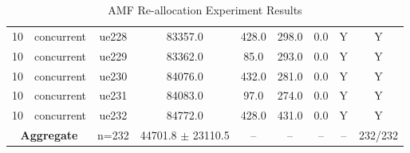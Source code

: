 \begin{table}[ht]
\begin{tabular}{|c|c|c|c|c|c|c|c|c|}
10 & concurrent & ue228 & 83357.0 & 428.0 & 298.0 & 0.0 & Y & Y \\
10 & concurrent & ue229 & 83362.0 & 85.0 & 293.0 & 0.0 & Y & Y \\
10 & concurrent & ue230 & 84076.0 & 432.0 & 281.0 & 0.0 & Y & Y \\
10 & concurrent & ue231 & 84083.0 & 97.0 & 274.0 & 0.0 & Y & Y \\
10 & concurrent & ue232 & 84772.0 & 428.0 & 431.0 & 0.0 & Y & Y \\
\multicolumn{2}{|c|}{\textbf{Aggregate}} & n=232 & 44701.8 $\pm$ 23110.5 & -- & -- & -- & -- & 232/232 \\
\hline
\end{tabular}
\caption{AMF Re-allocation Experiment Results}
\label{tab:amf_realloc}
\end{table}
